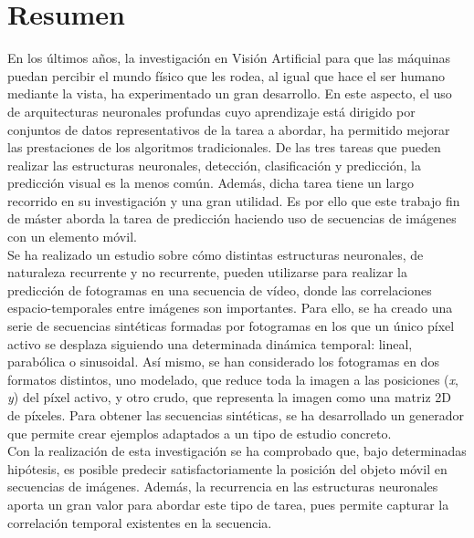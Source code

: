 \chapter*{Resumen}

En los últimos años, la investigación en Visión Artificial para que las máquinas puedan percibir el mundo físico que les rodea, al igual que hace el ser humano mediante la vista, ha experimentado un gran desarrollo. En este aspecto, el uso de arquitecturas neuronales profundas cuyo aprendizaje está dirigido por conjuntos de datos representativos de la tarea a abordar, ha permitido mejorar las prestaciones de los algoritmos tradicionales. De las tres tareas que pueden realizar las estructuras neuronales, detección, clasificación y predicción, la predicción visual es la menos común. Además, dicha tarea tiene un largo recorrido en su investigación y una gran utilidad. Es por ello que este trabajo fin de máster aborda la tarea de predicción haciendo uso de secuencias de imágenes con un elemento móvil.\\

Se ha realizado un estudio sobre cómo distintas estructuras neuronales, de naturaleza recurrente y no recurrente, pueden utilizarse para realizar la predicción de fotogramas en una secuencia de vídeo, donde las correlaciones espacio-temporales entre imágenes son importantes. Para ello, se ha creado una serie de secuencias sintéticas formadas por fotogramas en los que un único píxel activo se desplaza siguiendo una determinada dinámica temporal: lineal, parabólica o sinusoidal. Así mismo, se han considerado los fotogramas en dos formatos distintos, uno modelado, que reduce toda la imagen a las posiciones (\textit{x}, \textit{y}) del píxel activo, y otro crudo, que representa la imagen como una matriz 2D de píxeles. Para obtener las secuencias sintéticas,  se ha desarrollado un generador que permite crear ejemplos adaptados a un tipo de estudio concreto.\\

Con la realización de esta investigación se ha comprobado que, bajo determinadas hipótesis, es posible predecir satisfactoriamente la posición del objeto móvil en secuencias de imágenes. Además, la recurrencia en las estructuras neuronales aporta un gran valor para abordar este tipo de tarea, pues permite capturar la correlación temporal existentes en la secuencia.